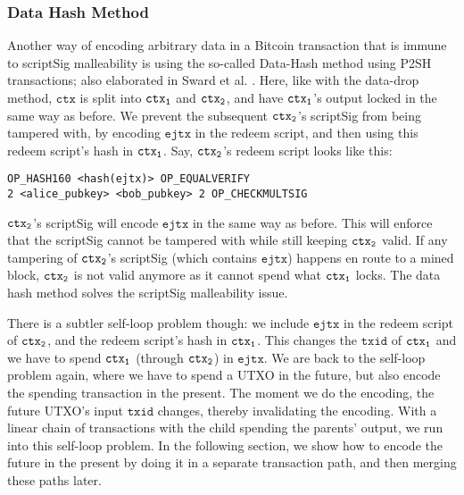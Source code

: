 \subsubsection{Data Hash Method}
\sloppy
Another way of encoding arbitrary data in a Bitcoin transaction that is immune to scriptSig malleability is using the so-called Data-Hash method using P2SH transactions; also elaborated in Sward et al. \cite{sward2018data}. Here, like with the data-drop method, $\texttt{ctx}$ is split into $\texttt{ctx\textsubscript{1}}$ and $\texttt{ctx\textsubscript{2}}$, and have $\texttt{ctx\textsubscript{1}}$'s output locked in the same way as before. We prevent the subsequent $\texttt{ctx\textsubscript{2}}$'s scriptSig from being tampered with, by encoding $\texttt{ejtx}$ in the redeem script, and then using this redeem script's hash in $\texttt{ctx\textsubscript{1}}$. Say, $\texttt{ctx\textsubscript{2}}$'s redeem script looks like this: 
\begin{verbatim}
OP_HASH160 <hash(ejtx)> OP_EQUALVERIFY
2 <alice_pubkey> <bob_pubkey> 2 OP_CHECKMULTSIG
\end{verbatim}

$\texttt{ctx\textsubscript{2}}$'s scriptSig will encode $\texttt{ejtx}$ in the same way as before. This will enforce that the scriptSig cannot be tampered with while still keeping $\texttt{ctx\textsubscript{2}}$ valid. If any tampering of $\texttt{ctx\textsubscript{2}}$'s scriptSig (which contains $\texttt{ejtx}$) happens en route to a mined block, $\texttt{ctx\textsubscript{2}}$ is not valid anymore as it cannot spend what $\texttt{ctx\textsubscript{1}}$ locks. The data hash method solves the scriptSig malleability issue. 

There is a subtler self-loop problem though: we include $\texttt{ejtx}$ in the redeem script of $\texttt{ctx\textsubscript{2}}$, and the redeem script's hash in $\texttt{ctx\textsubscript{1}}$. This changes the $\texttt{txid}$ of $\texttt{ctx\textsubscript{1}}$ and we have to spend $\texttt{ctx\textsubscript{1}}$ (through $\texttt{ctx\textsubscript{2}}$) in $\texttt{ejtx}$. We are back to the self-loop problem again, where we have to spend a UTXO in the future, but also encode the spending transaction in the present. The moment we do the encoding, the future UTXO's input $\texttt{txid}$ changes, thereby invalidating the encoding. With a linear chain of transactions with the child spending the parents' output, we run into this self-loop problem. In the following section, we show how to encode the future in the present by doing it in a separate transaction path, and then merging these paths later.

